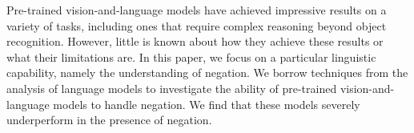Pre-trained vision-and-language models have achieved impressive results on a variety of tasks, including ones that require complex reasoning beyond object recognition. However, little is known about how they achieve these results or what their limitations are. In this paper, we focus on a particular linguistic capability, namely the understanding of negation. We borrow techniques from the analysis of language models to investigate the ability of pre-trained vision-and-language models to handle negation. We find that these models severely underperform in the presence of negation.
